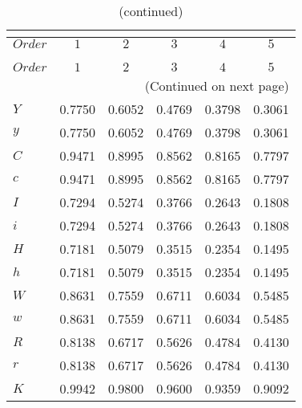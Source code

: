  
\begin{center}
\begin{longtable}{lccccc} 
\caption{COEFFICIENTS OF AUTOCORRELATION}\\
 \label{Table:th_autocorr_matrix}\\
\toprule 
$Order   $	 & 	 $         1$	 & 	 $         2$	 & 	 $         3$	 & 	 $         4$	 & 	 $         5$\\
\midrule \endfirsthead 
\caption{(continued)}\\
 \toprule \\ 
$Order   $	 & 	 $         1$	 & 	 $         2$	 & 	 $         3$	 & 	 $         4$	 & 	 $         5$\\
\midrule \endhead 
\midrule \multicolumn{6}{r}{(Continued on next page)} \\ \bottomrule \endfoot 
\bottomrule \endlastfoot 
$Y       $	 & 	    0.7750	 & 	    0.6052	 & 	    0.4769	 & 	    0.3798	 & 	    0.3061 \\ 
$y       $	 & 	    0.7750	 & 	    0.6052	 & 	    0.4769	 & 	    0.3798	 & 	    0.3061 \\ 
$C       $	 & 	    0.9471	 & 	    0.8995	 & 	    0.8562	 & 	    0.8165	 & 	    0.7797 \\ 
$c       $	 & 	    0.9471	 & 	    0.8995	 & 	    0.8562	 & 	    0.8165	 & 	    0.7797 \\ 
$I       $	 & 	    0.7294	 & 	    0.5274	 & 	    0.3766	 & 	    0.2643	 & 	    0.1808 \\ 
$i       $	 & 	    0.7294	 & 	    0.5274	 & 	    0.3766	 & 	    0.2643	 & 	    0.1808 \\ 
$H       $	 & 	    0.7181	 & 	    0.5079	 & 	    0.3515	 & 	    0.2354	 & 	    0.1495 \\ 
$h       $	 & 	    0.7181	 & 	    0.5079	 & 	    0.3515	 & 	    0.2354	 & 	    0.1495 \\ 
$W       $	 & 	    0.8631	 & 	    0.7559	 & 	    0.6711	 & 	    0.6034	 & 	    0.5485 \\ 
$w       $	 & 	    0.8631	 & 	    0.7559	 & 	    0.6711	 & 	    0.6034	 & 	    0.5485 \\ 
$R       $	 & 	    0.8138	 & 	    0.6717	 & 	    0.5626	 & 	    0.4784	 & 	    0.4130 \\ 
$r       $	 & 	    0.8138	 & 	    0.6717	 & 	    0.5626	 & 	    0.4784	 & 	    0.4130 \\ 
$K       $	 & 	    0.9942	 & 	    0.9800	 & 	    0.9600	 & 	    0.9359	 & 	    0.9092 \\ 

\end{longtable}
\end{center}
